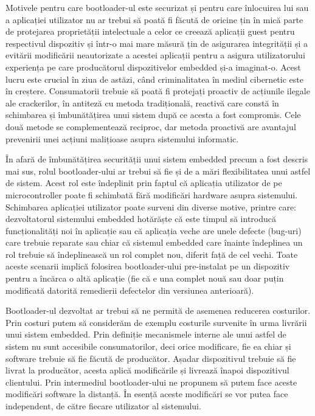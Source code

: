 \documentclass[12pt,a4paper,titlepage]{report}
\begin{document}
Motivele pentru care bootloader-ul este securizat și pentru care înlocuirea lui sau a aplicației utilizator
nu ar trebui să poată fi făcută de oricine țin în mică parte de protejarea proprietății intelectuale a celor ce creează aplicații guest pentru respectivul dispozitiv și într-o mai mare măsură țin de asigurarea integrității și a evitării modificării neautorizate a acestei aplicații pentru a asigura utilizatorului experiența pe care producătorul dispozitivelor embedded și-a imaginat-o. Acest lucru este crucial în ziua de astăzi, când criminalitatea în mediul cibernetic este în creștere\cite{interpol}\cite{morgan2016}. Consumatorii trebuie să poată fi protejați proactiv de acțiunile ilegale ale crackerilor, în antiteză cu metoda tradițională, reactivă care constă în schimbarea și îmbunătățirea unui sistem după ce acesta a fost compromis. Cele două metode se complementează reciproc, dar metoda proactivă are avantajul prevenirii unei acțiuni malițioase asupra sistemului informatic.

În afară de îmbunătățirea securității unui sistem embedded precum a fost descris mai sus, rolul bootloader-ului ar trebui să fie și de a mări flexibilitatea unui astfel de sistem. Acest rol este îndeplinit prin faptul că aplicația utilizator de pe microcontroller poate fi schimbată fără modificări hardware asupra sistemului. Schimbarea aplicației utilizator poate surveni din diverse motive, printre care: dezvoltatorul sistemului embedded hotărăște că este timpul să introducă funcționalități noi în aplicație sau că aplicația veche are unele defecte (bug-uri) care trebuie reparate sau chiar că sistemul embedded care înainte îndeplinea un rol trebuie să îndeplinească un rol complet nou, diferit față de cel vechi. Toate aceste scenarii implică folosirea bootloader-ului pre-instalat pe un dispozitiv pentru a încărca o altă aplicație (fie că e una complet nouă sau doar puțin modificată datorită remedierii defectelor din versiunea anterioară).

Bootloader-ul dezvoltat ar trebui să ne permită de asemenea reducerea costurilor. Prin costuri putem să considerăm de exemplu costurile survenite în urma livrării unui sistem embedded. Prin definiție mecanismele interne ale unui astfel de sistem nu sunt accesibile consumatorilor, deci orice modificare, fie ea chiar și software trebuie să fie făcută de producător. Așadar dispozitivul trebuie să fie livrat la producător, acesta aplică modificările și livrează înapoi dispozitivul clientului. Prin intermediul bootloader-ului ne propunem să putem face aceste modificări software la distanță. În esență aceste modificări se vor putea face independent, de către fiecare utilizator al sistemului.
\end{document}
